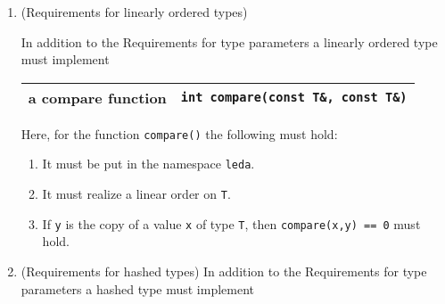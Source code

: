 \begin{enumerate}
\begin{tabular}[h]{|ll|}
	    
	  \end{tabular}


      


      \item 
        

 (Requirements for linearly ordered types) 

In addition to the 
Requirements for type parameters a linearly ordered type must implement 

\begin{tabular}[h]{|ll|}
   \hline
   
	    
	      
		a compare function & \verb$int compare(const T&, const T&)$\\
   \hline
	      
	    
	  \end{tabular}



        

 Here, for the function \verb$compare()$
        the following must hold:

\begin{enumerate}
 
            \item 
                

 It must be put in the namespace \verb$leda$.
            
            \item 
                

 It must realize a linear order on \verb$T$.
            
            \item 
                

 If \verb$y$ is the copy of a value \verb$x$ of type \verb$T$, then
                \verb$compare(x,y) == 0$ must hold.
            
          
\end{enumerate}


      



      \item 
        

 (Requirements for hashed types) 
In addition to the
 Requirements for type parameters a hashed type must implement


\begin{tabular}[h]{|ll|}
   \hline
   
	    
	      

\end{tabular}
\end{enumerate}
